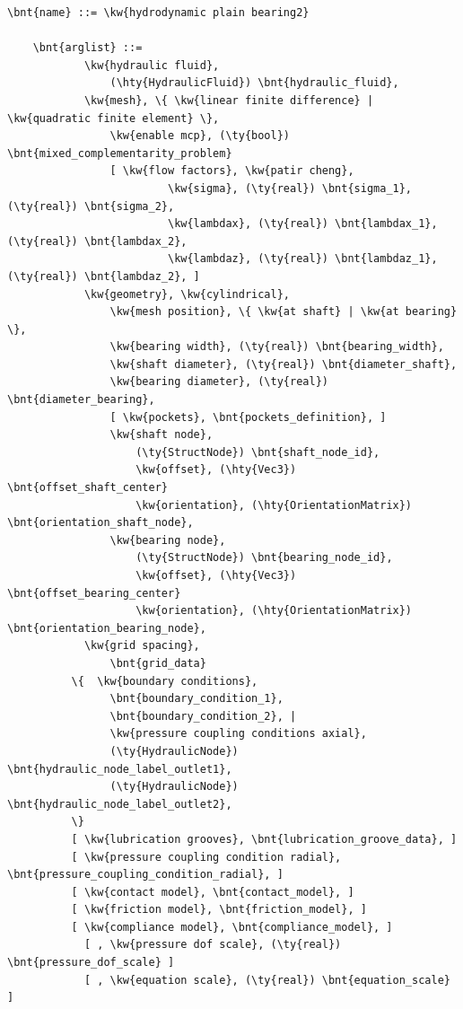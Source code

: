 \begin{Verbatim}[commandchars=\\\{\}]
    \bnt{name} ::= \kw{hydrodynamic plain bearing2}

    \bnt{arglist} ::=
            \kw{hydraulic fluid},
                (\hty{HydraulicFluid}) \bnt{hydraulic_fluid},
            \kw{mesh}, \{ \kw{linear finite difference} | \kw{quadratic finite element} \},
                \kw{enable mcp}, (\ty{bool}) \bnt{mixed_complementarity_problem}
                [ \kw{flow factors}, \kw{patir cheng},
                         \kw{sigma}, (\ty{real}) \bnt{sigma_1}, (\ty{real}) \bnt{sigma_2},
                         \kw{lambdax}, (\ty{real}) \bnt{lambdax_1}, (\ty{real}) \bnt{lambdax_2},
                         \kw{lambdaz}, (\ty{real}) \bnt{lambdaz_1}, (\ty{real}) \bnt{lambdaz_2}, ]
            \kw{geometry}, \kw{cylindrical},
                \kw{mesh position}, \{ \kw{at shaft} | \kw{at bearing} \},
                \kw{bearing width}, (\ty{real}) \bnt{bearing_width},
                \kw{shaft diameter}, (\ty{real}) \bnt{diameter_shaft},
                \kw{bearing diameter}, (\ty{real}) \bnt{diameter_bearing},
                [ \kw{pockets}, \bnt{pockets_definition}, ]
                \kw{shaft node},
                    (\ty{StructNode}) \bnt{shaft_node_id},
                    \kw{offset}, (\hty{Vec3}) \bnt{offset_shaft_center}
                    \kw{orientation}, (\hty{OrientationMatrix}) \bnt{orientation_shaft_node},
                \kw{bearing node},
                    (\ty{StructNode}) \bnt{bearing_node_id},
                    \kw{offset}, (\hty{Vec3}) \bnt{offset_bearing_center}
                    \kw{orientation}, (\hty{OrientationMatrix}) \bnt{orientation_bearing_node},
            \kw{grid spacing},
                \bnt{grid_data}
          \{  \kw{boundary conditions},
                \bnt{boundary_condition_1},
                \bnt{boundary_condition_2}, |
                \kw{pressure coupling conditions axial},
                (\ty{HydraulicNode}) \bnt{hydraulic_node_label_outlet1},
                (\ty{HydraulicNode}) \bnt{hydraulic_node_label_outlet2},
          \}
          [ \kw{lubrication grooves}, \bnt{lubrication_groove_data}, ]
          [ \kw{pressure coupling condition radial}, \bnt{pressure_coupling_condition_radial}, ]
          [ \kw{contact model}, \bnt{contact_model}, ]
          [ \kw{friction model}, \bnt{friction_model}, ]
          [ \kw{compliance model}, \bnt{compliance_model}, ]
            [ , \kw{pressure dof scale}, (\ty{real}) \bnt{pressure_dof_scale} ]
            [ , \kw{equation scale}, (\ty{real}) \bnt{equation_scale} ]

\end{Verbatim}
